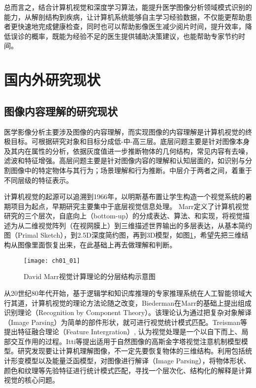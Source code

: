 总而言之，结合计算机视觉和深度学习算法，能提升医学图像分析领域模式识别的能力，从解剖结构到疾病，让计算机系统能够自主学习经验数据，不仅能更帮助患者更快速地完成健康检查，同时也可以帮助影像医生减少阅片时间，提升效率，降低误诊的概率，既能为经验不足的医生提供辅助决策建议，也能帮助专家节约时间。   

\section{国内外研究现状}

\subsection{图像内容理解的研究现状}

医学影像分析主要涉及图像的内容理解，而实现图像的内容理解是计算机视觉的终极目标\citep{Cootes2004}。可根据研究对象和目标分成低-中-高三层。底层问题主要是针对图像本身及其内在属性的分析，依据灰度值进一步推断物体的几何结构，常见内容有去噪，滤波和特征增强。高层问题主要是针对图像内容的理解和认知层面的，如识别与分割图像中的特定物体与其行为；场景理解和行为推断。中层介于两者之间，着重于不同层级的特征表示。

计算机视觉的起源可以追溯到1966年，以明斯基布置让学生构造一个视觉系统的暑期项目为起点，早期研究主要集中于底层视觉信息处理。
Marr\citep{Marr1982Vision}定义了计算机视觉研究的三个层次，自底向上（bottom-up）的分成表达、算法、和实现，将视觉描述为从二维视觉阵列（在视网膜上）到三维描述世界输出的多层表达，从基本简约图（Primal Sketch），到2.5D深度简约图，再到3D模型，如图\ref{fig:ch01_01}，希望先把三维结构从图像里面恢复出来，在此基础上再去做理解和判断。

\begin{figure}[!htbp]
    \centering
    \texttt{[image: ch01\_01]}
    \caption{David Marr视觉计算理论的分层结构示意图}
    \label{fig:ch01_01}
\end{figure}

从20世纪80年代开始，基于逻辑学和知识库推理的专家推理系统在人工智能领域大行其道，计算机视觉的理论方法论随之改变，Biederman在Marr的基础上提出组成识别理论（Recognition by Component Theory）。该理论认为通过把复杂对象解译（Image Parsing）为简单的部件形状，就可进行视觉统计模式匹配。Treisman等\citep{treisman1980a}提出特征融合理论（Feature Intergration）, 认为视觉处理是一个以自下而上、局部交互作用的过程。Itti等\citep{Itti2005}提出适用于自然图像的高斯金字塔视觉注意机制模型模型。研究发现要让计算机理解图像，不一定先要恢复物体的三维结构。利用包括统计形变模型\citep{Cootes2004}以及能量泛函模型\citep{Kass1988}，对图像进行解译（Image Parsing），将物体形状、颜色和纹理等先验特征进行统计模式匹配，寻找一个层次化、结构化的解释是计算视觉的核心问题。


